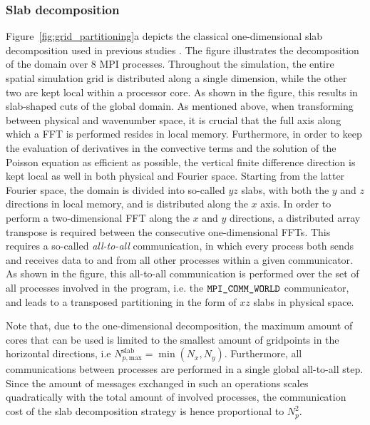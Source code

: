\subsubsection{Slab decomposition} 
Figure~\ref{fig:grid_partitioning}a depicts the classical one-dimensional slab decomposition used in previous studies \citep{delport2009constrained, calaf2010large, goit2015optimal}. The figure illustrates the decomposition of the domain over 8 MPI processes. Throughout the simulation, the entire spatial simulation grid is distributed along a single dimension, while the other two are kept local within a processor core. As shown in the figure, this results in slab-shaped cuts of the global domain. As mentioned above, when transforming between physical and wavenumber space, it is crucial that the full axis along which a FFT is performed resides in local memory. Furthermore, in order to keep the evaluation of derivatives in the convective terms and the solution of the Poisson equation as efficient as possible, the vertical finite difference direction is kept local as well in both physical and Fourier space. Starting from the latter Fourier space, the domain is divided into so-called $yz$ slabs, with both the $y$ and $z$ directions in local memory, and is distributed along the $x$ axis.  In order to perform a two-dimensional FFT along the $x$ and $y$ directions, a distributed array transpose is required between the consecutive one-dimensional FFTs. This requires a so-called \emph{all-to-all} communication, in which every process both sends and receives data to and from all other processes within a given communicator. As shown in the figure, this all-to-all communication is performed over the set of all processes involved in the program, i.e. the $\verb|MPI_COMM_WORLD|$ communicator, and leads to a transposed partitioning in the form of $xz$ slabs in physical space. 

Note that, due to the one-dimensional decomposition, the maximum amount of cores that can be used is limited to the smallest amount of gridpoints in the horizontal directions, i.e $N_{p,\text{max}}^{\text{slab}} = \min(N_x, N_y)$. Furthermore, all communications between processes are performed in a single global all-to-all step. Since the amount of messages exchanged in such an operations scales quadratically with the total amount of involved processes, the communication cost of the slab decomposition strategy is hence proportional to $N_p^2$.


